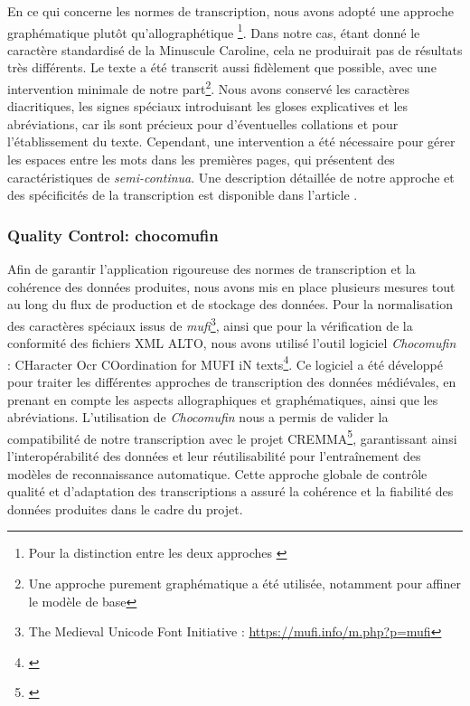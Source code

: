 \documentclass[a4paper, twoside, 12pt]{book}
\begin{document}
En ce qui concerne les normes de transcription, nous avons adopté une approche graphématique plutôt qu'allographétique \footnote{Pour la distinction entre les deux approches \cite{}}. Dans notre cas, étant donné le caractère standardisé de la Minuscule Caroline, cela ne produirait pas de résultats très différents. Le texte a été transcrit aussi fidèlement que possible, avec une intervention minimale de notre part\footnote{Une approche purement graphématique a été utilisée, notamment pour affiner le modèle de base}. Nous avons conservé les caractères diacritiques, les signes spéciaux introduisant les gloses explicatives et les abréviations, car ils sont précieux pour d'éventuelles collations et pour l'établissement du texte. Cependant, une intervention a été nécessaire pour gérer les espaces entre les mots dans les premières pages, qui présentent des caractéristiques de \textit{semi-continua}. Une description détaillée de notre approche et des spécificités de la transcription est disponible dans l'article \cite{clerice2023cremma}. \\

\subsubsection{Quality Control: chocomufin}

Afin de garantir l'application rigoureuse des normes de transcription et la cohérence des données produites, nous avons mis en place plusieurs mesures tout au long du flux de production et de stockage des données. Pour la normalisation des caractères spéciaux issus de \textit{mufi}\footnote{The Medieval Unicode Font Initiative : \url{https://mufi.info/m.php?p=mufi}}, ainsi que pour la vérification de la conformité des fichiers XML ALTO, nous avons utilisé l'outil logiciel \textit{Chocomufin} : CHaracter Ocr COordination for MUFI iN texts\footnote{\cite{Clerice_Choco-Mufin_a_tool_2021}}. Ce logiciel a été développé pour traiter les différentes approches de transcription des données médiévales, en prenant en compte les aspects allographiques et graphématiques, ainsi que les abréviations. L'utilisation de \textit{Chocomufin} nous a permis de valider la compatibilité de notre transcription avec le projet \textsc{CREMMA}\footnote{\cite{pinche2022cremmalab}}, garantissant ainsi l'interopérabilité des données et leur réutilisabilité pour l'entraînement des modèles de reconnaissance automatique. Cette approche globale de contrôle qualité et d'adaptation des transcriptions a assuré la cohérence et la fiabilité des données produites dans le cadre du projet.\\
\end{document}
